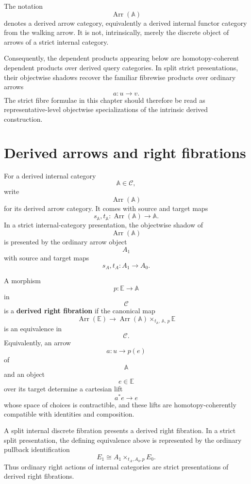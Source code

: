 \begin{remark}
\label{rem:derived-poly-intrinsic-objectwise-arrow-data}
The notation
\[
\operatorname{Arr}(\mathbb A)
\]
denotes a derived arrow category, equivalently a derived internal functor
category from the walking arrow.  It is not, intrinsically, merely the discrete
object of arrows of a strict internal category.

Consequently, the dependent products appearing below are homotopy-coherent
dependent products over derived query categories.  In split strict
presentations, their objectwise shadows recover the familiar fibrewise
products over ordinary arrows
\[
a:u\to v.
\]
The strict fibre formulae in this chapter should therefore be read as
representative-level objectwise specializations of the intrinsic derived
construction.
\end{remark}

\section{Derived arrows and right fibrations}
\label{sec:derived-poly-right-fibrations}

For a derived internal category
\[
\mathbb A\in\mathcal C,
\]
write
\[
\operatorname{Arr}(\mathbb A)
\]
for its derived arrow category.  It comes with source and target maps
\[
s_{\mathbb A},t_{\mathbb A}:
\operatorname{Arr}(\mathbb A)\to\mathbb A.
\]
In a strict internal-category presentation, the objectwise shadow of
\[
\operatorname{Arr}(\mathbb A)
\]
is presented by the ordinary arrow object
\[
A_1
\]
with source and target maps
\[
s_A,t_A:A_1\to A_0.
\]

\begin{definition}
\label{def:derived-poly-right-fibration}
A morphism
\[
p:\mathbb E\to\mathbb A
\]
in
\[
\mathcal C
\]
is a \textbf{derived right fibration} if the canonical map
\[
\operatorname{Arr}(\mathbb E)
\longrightarrow
\operatorname{Arr}(\mathbb A)
\times_{t_{\mathbb A},\,\mathbb A,\,p}
\mathbb E
\]
is an equivalence in
\[
\mathcal C.
\]
Equivalently, an arrow
\[
a:u\to p(e)
\]
of
\[
\mathbb A
\]
and an object
\[
e\in\mathbb E
\]
over its target determine a cartesian lift
\[
a^\ast e\to e
\]
whose space of choices is contractible, and these lifts are
homotopy-coherently compatible with identities and composition.
\end{definition}

\begin{remark}
\label{rem:derived-poly-strict-right-fibration-presentations}
A split internal discrete fibration presents a derived right fibration.  In a
strict split presentation, the defining equivalence above is represented by
the ordinary pullback identification
\[
E_1
\cong
A_1\times_{t_A,A_0,p}E_0.
\]
Thus ordinary right actions of internal categories are strict presentations of
derived right fibrations.
\end{remark}

